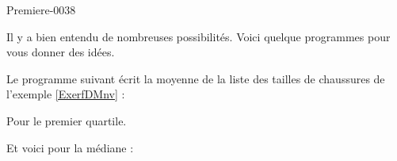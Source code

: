 
\begin{corrige}{Premiere-0038}

    Il y a bien entendu de nombreuses possibilités. Voici quelque programmes pour vous donner des idées.

    
Le programme suivant écrit la moyenne de la liste des tailles de chaussures de l'exemple \ref{ExerfDMnv} :



%


    Pour le premier quartile.



Et voici pour la médiane :




\end{corrige}
